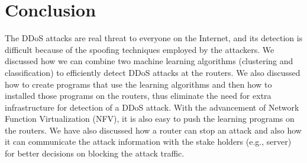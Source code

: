 \documentclass[12pt,oneside,a4paper]{article}
\begin{document}
\pagebreak
\section{Conclusion}

The DDoS attacks are real threat to everyone on the Internet, and its detection is difficult because of the spoofing techniques employed by the attackers. We discussed how we can combine two machine learning algorithms (clustering and classification) to efficiently detect DDoS attacks at the routers. We also discussed how to create programs that use the learning algorithms and then how to installed those programs on the routers, thus eliminate the need for extra infrastructure for detection of a DDoS attack. With the advancement of Network Function Virtualization (NFV), it is also easy to push the learning programs on the routers. We have also discussed how a router can stop an attack and also how it can communicate the attack information with the stake holders (e.g., server) for better decisions on blocking the attack traffic.

\pagebreak

\singlespacing
\end{document}
